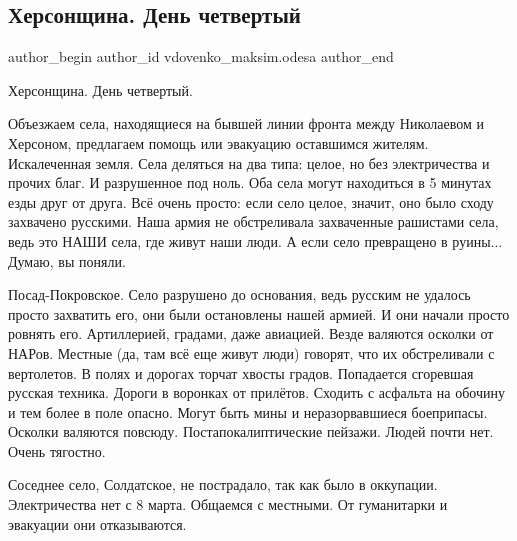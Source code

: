  
 
 
 
 

\subsection{Херсонщина. День четвертый}
\label{sec:30_12_2022.fb.vdovenko_maksim.odesa.1.khersonshchina__den_}

\ifcmt
 author_begin
   author_id vdovenko_maksim.odesa
 author_end
\fi

Херсонщина. День четвертый.

Объезжаем села, находящиеся на бывшей линии фронта между Николаевом и Херсоном,
предлагаем помощь или эвакуацию оставшимся жителям. Искалеченная земля. Села
деляться на два типа: целое, но без электричества и прочих благ. И разрушенное
под ноль. Оба села могут находиться в 5 минутах езды друг от друга. Всё очень
просто: если село целое, значит, оно было сходу захвачено русскими. Наша армия
не обстреливала захваченные рашистами села, ведь это НАШИ села, где живут наши
люди. А если село превращено в руины... Думаю, вы поняли.

Посад-Покровское. Село разрушено до основания, ведь русским не удалось просто
захватить его, они были остановлены нашей армией. И они начали просто ровнять
его. Артиллерией, градами, даже авиацией. Везде валяются осколки от НАРов.
Местные (да, там всё еще живут люди) говорят, что их обстреливали с вертолетов.
В полях и дорогах торчат хвосты градов. Попадается сгоревшая русская техника.
Дороги в воронках от прилётов. Сходить с асфальта на обочину и тем более в поле
опасно. Могут быть мины и неразорвавшиеся боеприпасы. Осколки валяются повсюду.
Постапокалиптические пейзажи. Людей почти нет. Очень тягостно.

Соседнее село, Солдатское, не пострадало, так как было в оккупации.
Электричества нет с 8 марта. Общаемся с местными. От гуманитарки и эвакуации
они отказываются.

